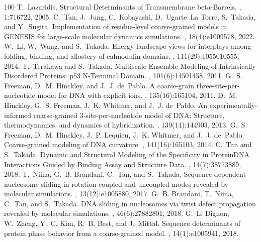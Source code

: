 \documentclass[a4paper,11pt,oneside,english]{sphinxmanual}
\begin{document}
\begin{sphinxthebibliography}{100}
T. Lazaridis. Structural Determinants of Transmembrane beta-Barrels. , 1:716\textendash{}722, 2005.
C. Tan, J. Jung, C. Kobayashi, D. Ugarte La Torre, S. Takada, and Y. Sugita. Implementation of residue-level coarse-grained models in GENESIS for large-scale molecular dynamics simulations. , 18(4):e1009578, 2022.
W. Li, W. Wang, and S. Takada. Energy landscape views for interplays among folding, binding, and allostery of calmodulin domains. , 111(29):10550\textendash{}10555, 2014.
T. Terakawa and S. Takada. Multiscale Ensemble Modeling of Intrinsically Disordered Proteins: p53 N-Terminal Domain. , 101(6):1450\textendash{}1458, 2011.
G. S. Freeman, D. M. Hinckley, and J. J. de Pablo. A coarse-grain three-site-per-nucleotide model for DNA with explicit ions. , 135(16):165104, 2011.
D. M. Hinckley, G. S. Freeman, J. K. Whitmer, and J. J. de Pablo. An experimentally-informed coarse-grained 3-site-per-nucleotide model of DNA: Structure, thermodynamics, and dynamics of hybridization. , 139(14):144903, 2013.
G. S. Freeman, D. M. Hinckley, J. P. Lequieu, J. K. Whitmer, and J. J. de Pablo. Coarse-grained modeling of DNA curvature. , 141(16):165103, 2014.
C. Tan and S. Takada. Dynamic and Structural Modeling of the Specificity in Protein\textendash{}DNA Interactions Guided by Binding Assay and Structure Data. , 14(7):3877\textendash{}3889, 2018.
T. Niina, G. B. Brandani, C. Tan, and S. Takada. Sequence-dependent nucleosome sliding in rotation-coupled and uncoupled modes revealed by molecular simulations. , 13(12):e1005880, 2017.
G. B. Brandani, T. Niina, C. Tan, and S. Takada. DNA sliding in nucleosomes via twist defect propagation revealed by molecular simulations. , 46(6):2788\textendash{}2801, 2018.
G. L. Dignon, W. Zheng, Y. C. Kim, R. B. Best, and J. Mittal. Sequence determinants of protein phase behavior from a coarse-grained model. , 14(1):e1005941, 2018.

\end{sphinxthebibliography}
\end{document}
